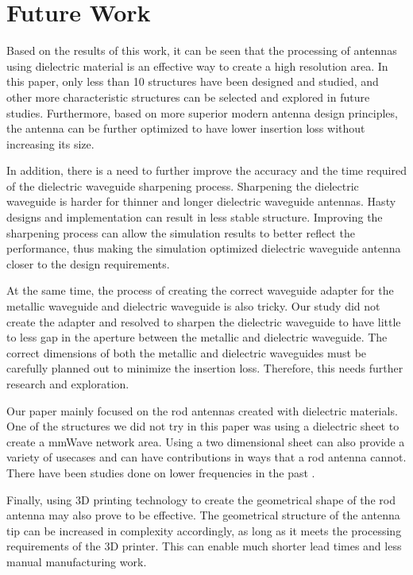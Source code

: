 \documentclass[a4paper,12pt]{report}
\begin{document}
\chapter{Future Work}

Based on the results of this work, it can be seen that the processing of
antennas using dielectric material is an effective way to create a high resolution area.
In this paper,
only less than 10 structures have been designed and studied,
and other more
characteristic structures can be selected and explored in future studies.
Furthermore,
based on more superior modern antenna design principles,
the antenna can be
further optimized to have lower insertion loss without
increasing its size.

In addition,
there is a need to further improve the accuracy and
the time required of the
dielectric waveguide sharpening process.
Sharpening the dielectric waveguide is harder
for thinner and longer dielectric waveguide antennas.
Hasty designs and implementation can result in less stable structure.
Improving the sharpening process can allow the simulation results to
better reflect the performance,
thus making the simulation optimized
dielectric waveguide antenna closer to the design requirements.

At the same time,
the process of creating the correct waveguide adapter
for the metallic waveguide and dielectric waveguide is also tricky.
Our study did not create the adapter
and resolved to sharpen the dielectric waveguide
to have little to less gap in the aperture
between the metallic and dielectric waveguide.
The correct dimensions of both
the metallic and dielectric waveguides
must be carefully planned out to minimize
the insertion loss.
Therefore, this needs further research and exploration.

Our paper mainly focused on the rod antennas created with dielectric materials.
One of the structures we did not try in this paper was using a
dielectric sheet to create a mmWave network area.
Using a two dimensional sheet can also provide a variety of usecases
and can have contributions in ways that a rod antenna cannot.
There have been studies done on lower frequencies in the past \cite{4297420}.

Finally, using 3D printing technology to create the geometrical shape
of the rod antenna may also prove to be effective.
The
geometrical structure of the antenna tip can be increased in complexity accordingly,
as long as it meets the processing requirements of the 3D printer.
This can enable much shorter lead times and less manual manufacturing work.

\newpage
{}

\end{document}
